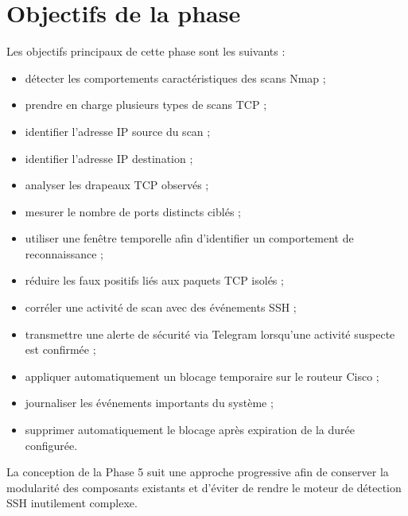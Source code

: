 \section{Objectifs de la phase}

Les objectifs principaux de cette phase sont les suivants :

\begin{itemize}

\item détecter les comportements caractéristiques des scans Nmap ;

\item prendre en charge plusieurs types de scans TCP ;

\item identifier l'adresse IP source du scan ;

\item identifier l'adresse IP destination ;

\item analyser les drapeaux TCP observés ;

\item mesurer le nombre de ports distincts ciblés ;

\item utiliser une fenêtre temporelle afin d'identifier un comportement de reconnaissance ;

\item réduire les faux positifs liés aux paquets TCP isolés ;

\item corréler une activité de scan avec des événements SSH ;

\item transmettre une alerte de sécurité via Telegram lorsqu'une activité suspecte est confirmée ;

\item appliquer automatiquement un blocage temporaire sur le routeur Cisco ;

\item journaliser les événements importants du système ;

\item supprimer automatiquement le blocage après expiration de la durée configurée.

\end{itemize}

La conception de la Phase 5 suit une approche progressive afin de conserver la modularité des composants existants et d'éviter de rendre le moteur de détection SSH inutilement complexe.

